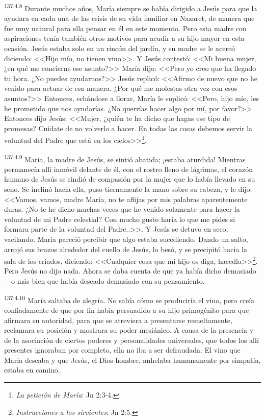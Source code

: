 \par 
\textsuperscript{137:4.8} Durante muchos años, María siempre se había dirigido a Jesús para que la ayudara en cada una de las crisis de su vida familiar en Nazaret, de manera que fue muy natural para ella pensar en él en este momento. Pero esta madre con aspiraciones tenía también otros motivos para acudir a su hijo mayor en esta ocasión. Jesús estaba solo en un rincón del jardín, y su madre se le acercó diciendo: <<Hijo mío, no tienen vino>>. Y Jesús contestó: <<Mi buena mujer, ¿en qué me concierne ese asunto?>> María dijo: <<Pero yo creo que ha llegado tu hora. ¿No puedes ayudarnos?>> Jesús replicó: <<Afirmo de nuevo que no he venido para actuar de esa manera. ¿Por qué me molestas otra vez con esos asuntos?>> Entonces, echándose a llorar, María le suplicó: <<Pero, hijo mío, les he prometido que nos ayudarías. ¿No querrías hacer algo por mí, por favor?>> Entonces dijo Jesús: <<Mujer, ¿quién te ha dicho que hagas ese tipo de promesas? Cuídate de no volverlo a hacer. En todas las cosas debemos servir la voluntad del Padre que está en los cielos>>\footnote{\textit{La petición de María}: Jn 2:3-4.}.

\par 
\textsuperscript{137:4.9} María, la madre de Jesús, se sintió abatida; ¡estaba aturdida! Mientras permanecía allí inmóvil delante de él, con el rostro lleno de lágrimas, el corazón humano de Jesús se rindió de compasión por la mujer que lo había llevado en su seno. Se inclinó hacia ella, puso tiernamente la mano sobre su cabeza, y le dijo: <<Vamos, vamos, madre María, no te aflijas por mis palabras aparentemente duras. ¿No te he dicho muchas veces que he venido solamente para hacer la voluntad de mi Padre celestial? Con mucho gusto haría lo que me pides si formara parte de la voluntad del Padre..>>. Y Jesús se detuvo en seco, vacilando. María pareció percibir que algo estaba sucediendo. Dando un salto, arrojó sus brazos alrededor del cuello de Jesús, lo besó, y se precipitó hacia la sala de los criados, diciendo: <<Cualquier cosa que mi hijo os diga, hacedla>>\footnote{\textit{Instrucciones a los sirvientes}: Jn 2:5.}. Pero Jesús no dijo nada. Ahora se daba cuenta de que ya había dicho demasiado ---o más bien que había deseado demasiado con su pensamiento.

\par 
\textsuperscript{137:4.10} María saltaba de alegría. No sabía cómo se produciría el vino, pero creía confiadamente de que por fin había persuadido a su hijo primogénito para que afirmara su autoridad, para que se atreviera a presentarse resueltamente, reclamara su posición y mostrara su poder mesiánico. A causa de la presencia y de la asociación de ciertos poderes y personalidades universales, que todos los allí presentes ignoraban por completo, ella no iba a ser defraudada. El vino que María deseaba y que Jesús, el Dios-hombre, anhelaba humanamente por simpatía, estaba en camino.

